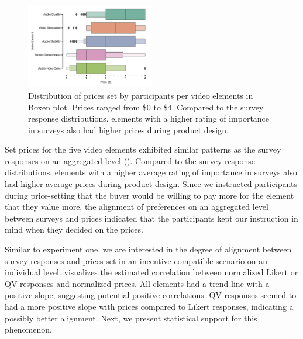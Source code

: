 \begin{figure}[ht]
    \centering
    \includegraphics[width=0.5\textwidth, keepaspectratio=true]{content/image/price_distribution_per_element.pdf}
    \caption{
      Distribution of prices set by participants per video elements in Boxen plot. 
      Prices ranged from \$0 to \$4. Compared to the survey response distributions, elements with a higher rating of importance in surveys also had higher prices during product design.
    }
    \label{fig:price_exp2}
\end{figure}


Set prices for the five video elements exhibited similar patterns as the survey responses on an aggregated level (). Compared to the survey response distributions, elements with a higher average rating of importance in surveys also had higher average prices during product design. Since we instructed participants during price-setting that the buyer would be willing to pay more for the element that they value more, the alignment of preferences on an aggregated level between surveys and prices indicated that the participants kept our instruction in mind when they decided on the prices.


Similar to experiment one, we are interested in the degree of alignment between survey responses and prices set in an incentive-compatible scenario on an individual level.  visualizes the estimated correlation between normalized Likert or QV responses and normalized prices. All elements had a trend line with a positive slope, suggesting potential positive correlations. QV responses seemed to had a more positive slope with prices compared to Likert responses, indicating a possibly better alignment. Next, we present statistical support for this phenomenon.


